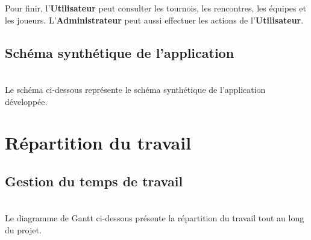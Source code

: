 \documentclass[10pt]{report}
\begin{document}
Pour finir, l'\textbf{Utilisateur} peut consulter les tournois, les rencontres, les équipes et les joueurs.
L'\textbf{Administrateur} peut aussi effectuer les actions de l'\textbf{Utilisateur}.

\newpage
\section{Schéma synthétique de l'application}
~\\
Le schéma ci-dessous représente le schéma synthétique de l'application développée. \\
	\begin{figure}[hp]
	      \begin{center}
	      \end{center}
	\end{figure}

\newpage
\chapter{Répartition du travail}
\section{Gestion du temps de travail}
~\\
Le diagramme de Gantt ci-dessous présente la répartition du travail tout au long du projet. \\
	\begin{figure}[hp]
	      \begin{center}
	      \end{center}
	\end{figure}
\\
\end{document}
